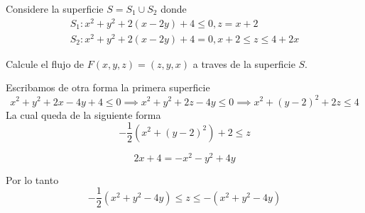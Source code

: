 \message{ !name(MAT024.tex)}\documentclass[../main.tex]{subfiles}
\begin{document}
\begin{problem}
  Considere la superficie $S = S_{1} \cup S_{2}$ donde
  \begin{gather*}
    S_{1} : x^{2} + y^{2} + 2(x - 2y) + 4 \leq 0, z = x + 2\\
    S_{2} : x^{2} + y^{2} + 2(x - 2y) + 4 = 0, x + 2 \leq z \leq 4 + 2x
  \end{gather*}

  Calcule el flujo de $F(x, y, z) = (z, y, x)$ a traves de la superficie $S$.
\end{problem}
\begin{solution}
  Escribamos de otra forma la primera superficie
  \begin{equation*}
    x^{2} + y^{2} + 2x - 4y + 4 \leq 0 \implies x^{2} + y^{2} + 2z - 4y \leq 0 \implies x^{2} + (y - 2)^{2} + 2z \leq 4
  \end{equation*}
  La cual queda de la siguiente forma
  \begin{equation*}
    -\frac{1}{2}(x^{2} + (y - 2)^{2}) + 2 \leq z
  \end{equation*}

  \begin{equation*}
    2x + 4 = -x^{2} -y^{2} + 4y
  \end{equation*}

  Por lo tanto
  \begin{equation*}
    -\frac{1}{2}(x^{2} + y^{2} - 4y) \leq z \leq -(x^{2} + y^{2} - 4y)
  \end{equation*}
\end{solution}
\end{document}

